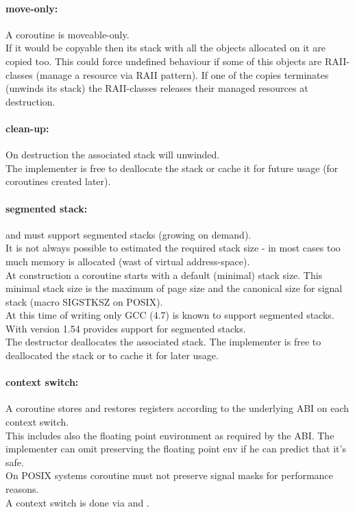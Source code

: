 \paragraph*{move-only:}
A coroutine is moveable-only.\\
\newline
If it would be copyable then its stack with all the objects allocated on it
are copied too. This could force undefined behaviour if some of this objects are
RAII-classes (manage a resource via RAII pattern). If one of the copies
terminates (unwinds its stack) the RAII-classes releases their managed resources
at destruction.

\paragraph*{clean-up:}
On destruction the associated stack will unwinded.\\
\newline
The implementer is free to deallocate the stack or cache it for future usage
(for coroutines created later).

\paragraph*{segmented stack:}
\pushcoro and \pullcoro must support segmented stacks (growing on demand).\\
\newline
It is not always possible to estimated the required stack size - in most cases
too much memory is allocated (wast of virtual address-space).\\
\newline
At construction a coroutine starts with a default (minimal) stack size. This minimal
stack size is the maximum of page size and the canonical size for signal stack
(macro SIGSTKSZ on POSIX).\\
\newline
At this time of writing only GCC (4.7)\cite{gccsplit} is known to support segmented
stacks. With version 1.54 \boostcoroutine provides support for segmented stacks.\\
\newline
The destructor deallocates the associated stack. The implementer is free to
deallocated the stack or to cache it for later usage.

\paragraph*{context switch:}
A coroutine stores and restores registers according to the underlying ABI on each
context switch.\\
\newline
This includes also the floating point environment as required by the ABI. The
implementer can omit preserving the floating point env if he can predict that
it's safe.\\
\newline
On POSIX systems coroutine must not preserve signal masks for performance reasons.\\
\newline
A context switch is done via \pushcoroop and \pullcoroop.

